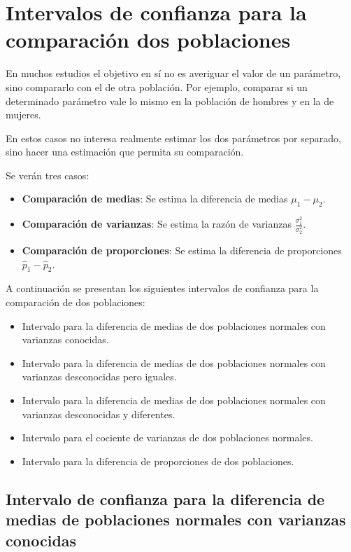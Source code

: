 \documentclass[
  a4paper,
]{scrreport}
\providecommand{\tightlist}{%
  \setlength{\itemsep}{0pt}\setlength{\parskip}{0pt}}\usepackage{longtable,booktabs,array}
\theoremstyle{plain}
\theoremstyle{definition}
\theoremstyle{definition}
\theoremstyle{remark}
\begin{document}
\hypertarget{intervalos-de-confianza-para-la-comparaciuxf3n-dos-poblaciones}{%
\section{Intervalos de confianza para la comparación dos
poblaciones}\label{intervalos-de-confianza-para-la-comparaciuxf3n-dos-poblaciones}}

En muchos estudios el objetivo en sí no es averiguar el valor de un
parámetro, sino compararlo con el de otra población. Por ejemplo,
comparar si un determinado parámetro vale lo mismo en la población de
hombres y en la de mujeres.

En estos casos no interesa realmente estimar los dos parámetros por
separado, sino hacer una estimación que permita su comparación.

Se verán tres casos:

\begin{itemize}
\tightlist
\item
  \textbf{Comparación de medias}: Se estima la diferencia de medias
  \(\mu_1-\mu_2\).
\item
  \textbf{Comparación de varianzas}: Se estima la razón de varianzas
  \(\displaystyle \frac{\sigma^2_1}{\sigma^2_2}\).
\item
  \textbf{Comparación de proporciones}: Se estima la diferencia de
  proporciones \(\hat p_1-\hat p_2\).
\end{itemize}

A continuación se presentan los siguientes intervalos de confianza para
la comparación de dos poblaciones:

\begin{itemize}
\tightlist
\item
  Intervalo para la diferencia de medias de dos poblaciones normales con
  varianzas conocidas.
\item
  Intervalo para la diferencia de medias de dos poblaciones normales con
  varianzas desconocidas pero iguales.
\item
  Intervalo para la diferencia de medias de dos poblaciones normales con
  varianzas desconocidas y diferentes.
\item
  Intervalo para el cociente de varianzas de dos poblaciones normales.
\item
  Intervalo para la diferencia de proporciones de dos poblaciones.
\end{itemize}

\hypertarget{intervalo-de-confianza-para-la-diferencia-de-medias-de-poblaciones-normales-con-varianzas-conocidas}{%
\subsection{Intervalo de confianza para la diferencia de medias de
poblaciones normales con varianzas
conocidas}\label{intervalo-de-confianza-para-la-diferencia-de-medias-de-poblaciones-normales-con-varianzas-conocidas}}
\end{document}
